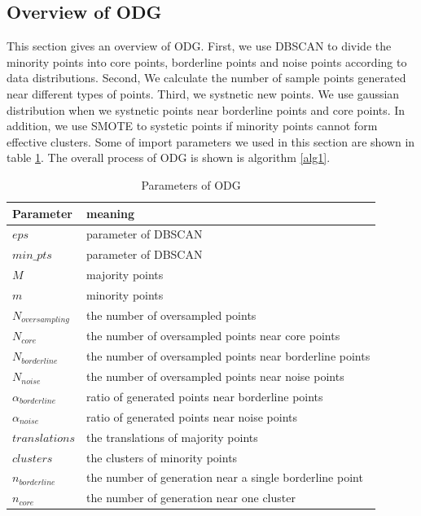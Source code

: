 \documentclass[runningheads]{llncs}
\begin{document}
\subsection{Overview of ODG}
This section gives an overview of ODG. 
First, we use DBSCAN to divide the minority points into core points, 
borderline points and noise points according 
to data distributions. 
Second, We calculate the number of sample points generated near different types of points.
Third, we systnetic new points.
We use gaussian distribution when we systnetic points near borderline points and core points.
In addition, we use SMOTE to systetic points if minority points cannot form effective clusters.
Some of import parameters we used in this section are shown in table \ref{table15}.
The overall process of ODG is shown is algorithm \ref{alg1}.
\begin{table}[]
  \caption{Parameters of ODG}
  \label{table15}
  \begin{tabular}{ll}
  \hline
  Parameter             & meaning                                                 \\ \hline
  $eps$                 & parameter of DBSCAN                                     \\
  $min\_pts$            & parameter of DBSCAN                                     \\
  $M$                   & majority points                                         \\
  $m$                   & minority points                                         \\
  $N_{oversampling}$    & the number of oversampled points                        \\
  $N_{core}$            & the number of oversampled points near core points       \\
  $N_{borderline}$      & the number of oversampled points near borderline points \\
  $N_{noise}$           & the number of oversampled points near noise points      \\
  $\alpha_{borderline}$ & ratio of generated points near borderline points        \\
  $\alpha_{noise}$      & ratio of generated points near noise points             \\
  $translations$        & the translations of majority points                     \\
  $clusters$            & the clusters of minority points                         \\ 
  $n_{borderline}$      & the number of generation near a single borderline point \\ 
  $n_{core}$            & the number of generation near one cluster               \\ \hline
  \end{tabular}
  \end{table}
\end{document}
